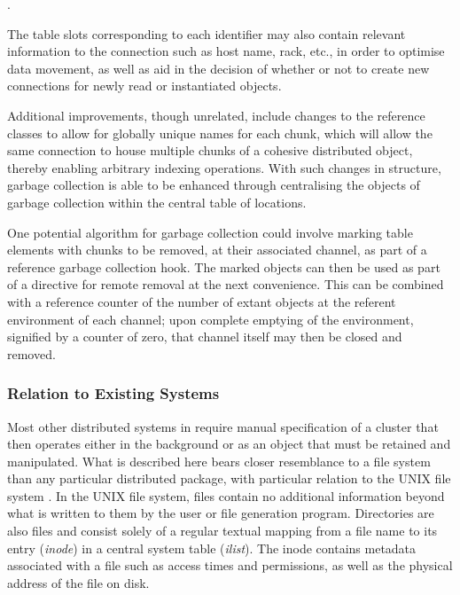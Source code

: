 .

The table slots corresponding to each identifier may also contain relevant information to the connection such as host name, rack, etc., in order to optimise data movement, as well as aid in the decision of whether or not to create new connections for newly read or instantiated objects.

Additional improvements, though unrelated, include changes to the reference classes to allow for globally unique names for each chunk, which will allow the same connection to house multiple chunks of a cohesive distributed object, thereby enabling arbitrary indexing operations.
With such changes in structure, garbage collection is able to be enhanced through centralising the objects of garbage collection within the central table of locations.

One potential algorithm for garbage collection could involve marking table elements with chunks to be removed, at their associated channel, as part of a reference garbage collection hook.
The marked objects can then be used as part of a directive for remote removal at the next convenience.
This can be combined with a reference counter of the number of extant objects at the referent environment of each channel; upon complete emptying of the environment, signified by a counter of zero, that channel itself may then be closed and removed.

\subsubsection{Relation to Existing Systems}\label{sec:localrel}

Most other distributed systems in \R{} require manual specification of a cluster that then operates either in the background or as an object that must be retained and manipulated.
What is described here bears closer resemblance to a file system than any particular distributed \R{} package, with particular relation to the UNIX file system \cites{ritchie1979evolution,thompson1974unix}.
In the UNIX file system, files contain no additional information beyond what is written to them by the user or file generation program.
Directories are also files and consist solely of a regular textual mapping from a file name to its entry (\emph{inode}) in a central system table (\emph{ilist}).
The inode contains metadata associated with a file such as access times and permissions, as well as the physical address of the file on disk.

